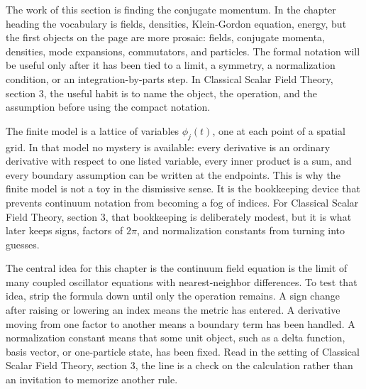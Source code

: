 











The work of this section is finding the conjugate momentum.  In the chapter heading the vocabulary is fields, densities, Klein-Gordon equation, energy, but the first objects on the page are more prosaic: fields, conjugate momenta, densities, mode expansions, commutators, and particles.  The formal notation will be useful only after it has been tied to a limit, a symmetry, a normalization condition, or an integration-by-parts step.  In Classical Scalar Field Theory, section 3, the useful habit is to name the object, the operation, and the assumption before using the compact notation.

The finite model is a lattice of variables \(\phi_j(t)\), one at each point of a spatial grid.  In that model no mystery is available: every derivative is an ordinary derivative with respect to one listed variable, every inner product is a sum, and every boundary assumption can be written at the endpoints.  This is why the finite model is not a toy in the dismissive sense.  It is the bookkeeping device that prevents continuum notation from becoming a fog of indices.  For Classical Scalar Field Theory, section 3, that bookkeeping is deliberately modest, but it is what later keeps signs, factors of \(2\pi\), and normalization constants from turning into guesses.

The central idea for this chapter is the continuum field equation is the limit of many coupled oscillator equations with nearest-neighbor differences.  To test that idea, strip the formula down until only the operation remains.  A sign change after raising or lowering an index means the metric has entered.  A derivative moving from one factor to another means a boundary term has been handled.  A normalization constant means that some unit object, such as a delta function, basis vector, or one-particle state, has been fixed.  Read in the setting of Classical Scalar Field Theory, section 3, the line is a check on the calculation rather than an invitation to memorize another rule.


